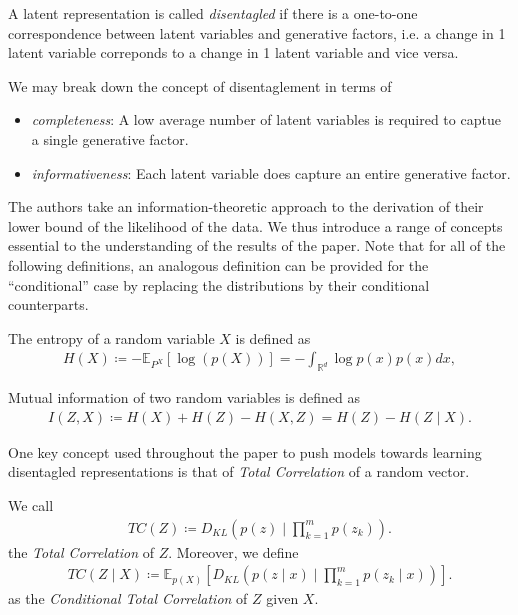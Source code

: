 \documentclass[twoside,11pt]{article}
\newcommand{\R}{\mathbb{R}}
\begin{document}
\begin{definition}
  A latent representation is called \textit{disentagled} if there is a one-to-one correspondence between latent variables and generative factors, i.e. a change in 1 latent variable correponds to a change in 1 latent variable and vice versa.
\end{definition}
We may break down the concept of disentaglement in terms of
\begin{itemize}
  \item \textit{completeness}: A low average number of latent variables is required to captue a single generative factor.
  \item \textit{informativeness}: Each latent variable does capture an entire generative factor.
\end{itemize}
The authors take an information-theoretic approach to the derivation of their lower bound of the likelihood of the data. We thus introduce a range of concepts essential to the understanding of the results of the paper. Note that for all of the following definitions, an analogous definition can be provided for the \enquote{conditional} case by replacing the distributions by their conditional counterparts.

\begin{definition}
  The entropy of a random variable $X$ is defined as
  \begin{align*}
    H(X) \coloneqq - \mathbb{E}_{P^{X}}[\log(p(X))] = - \int_{\R^{d}}\log p(x)p(x) dx,
  \end{align*}
\end{definition}

\begin{definition}
  Mutual information of two random variables is defined as
  \begin{align*}
    I(Z, X) \coloneqq H(X) + H(Z) - H(X, Z) = H(Z) - H(Z \mid X).
  \end{align*}
\end{definition}

One key concept used throughout the paper to push models towards learning disentagled representations is that of \textit{Total Correlation} of a random vector.

\begin{definition}
  We call
  \begin{align*}
    TC(Z) \coloneqq D_{KL}(p(z) \mid \prod_{k=1}^{m}p(z_{k})).
  \end{align*}
  the \textit{Total Correlation} of $Z$. Moreover, we define
  \begin{align*}
    TC(Z \mid X) \coloneqq \mathbb{E}_{p(X)}[D_{KL}(p(z \mid x) \mid \prod_{k=1}^{m}p(z_{k} \mid x))].
  \end{align*}
  as the \textit{Conditional Total Correlation} of $Z$ given $X$.
\end{definition}
\end{document}
